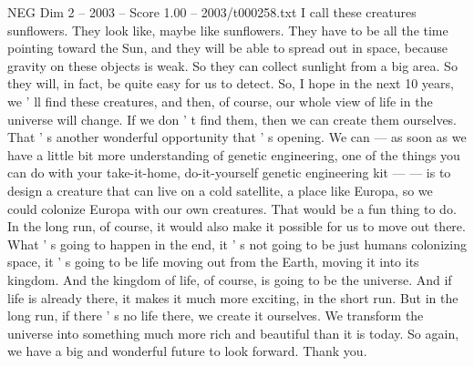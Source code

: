 \begin{textsample}{NEG Dim 2 – 2003 – Score 1.00 – 2003/t000258.txt}
I call these creatures sunflowers.
They look like, maybe like sunflowers.
They have to be all the time pointing toward the Sun, and they will be able to spread out in space, because gravity on these objects is weak.
So they can collect sunlight from a big area.
So they will, in fact, be quite easy for us to detect.
So, I hope in the next 10 years, we ' ll find these creatures, and then, of course, our whole view of life in the universe will change.
If we don ' t find them, then we can create them ourselves.
That ' s another wonderful opportunity that ' s opening.
We can — as soon as we have a little bit more understanding of genetic engineering, one of the things you can do with your take-it-home, do-it-yourself genetic engineering kit — — is to design a creature that can live on a cold satellite, a place like Europa, so we could colonize Europa with our own creatures.
That would be a fun thing to do.
In the long run, of course, it would also make it possible for us to move out there.
What ' s going to happen in the end, it ' s not going to be just humans colonizing space, it ' s going to be life moving out from the Earth, moving it into its kingdom.
And the kingdom of life, of course, is going to be the universe.
And if life is already there, it makes it much more exciting, in the short run.
But in the long run, if there ' s no life there, we create it ourselves.
We transform the universe into something much more rich and beautiful than it is today.
So again, we have a big and wonderful future to look forward.
Thank you.

\end{textsample}
